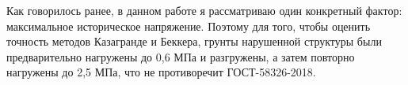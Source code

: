 Как говорилось ранее, в данном работе я рассматриваю один конкретный фактор: максимальное историческое напряжение. Поэтому для того, чтобы оценить точность методов Казагранде и Беккера, грунты нарушенной структуры были предварительно нагружены до 0,6 МПа и разгружены, а затем повторно нагружены до 2,5 МПа, что не противоречит ГОСТ-58326-2018.